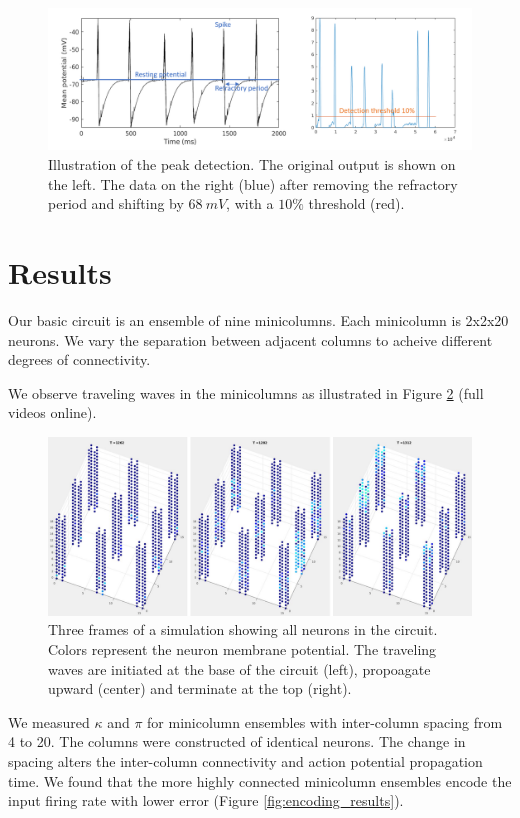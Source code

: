 \documentclass[a4paper,11pt]{article}
\begin{document}
\begin{figure}[!ht]
 \caption{Illustration of the peak detection. The original output is shown on the left. The data on the right (blue) after removing the refractory period and shifting by $68\ mV$, with a $10\%$ threshold (red). }
 \label{fig:peak_det}
 \centering
   \includegraphics[width=\textwidth]{fig/PeakDetectionExample}
\end{figure}


\clearpage
\section{Results}
Our basic circuit is an ensemble of nine minicolumns. 
Each minicolumn is 2x2x20 neurons. 
We vary the separation between adjacent columns to acheive different degrees of connectivity.

We observe traveling waves in the minicolumns as illustrated in Figure \ref{fig:firing_video} (full videos online).
\begin{figure}[!ht]
 \caption{Three frames of a simulation showing all neurons in the circuit. Colors represent the neuron membrane potential. The traveling waves are initiated at the base of the circuit (left), propoagate upward (center) and terminate at the top (right).} 
 \label{fig:firing_video}
 \centering
   \includegraphics[width=\textwidth]{fig/VideoStills}
\end{figure}

We measured $\kappa$ and $\pi$ for minicolumn ensembles with inter-column spacing from 4 to 20.
The columns were constructed of identical neurons.
The change in spacing alters the inter-column connectivity and action potential propagation time.
We found that the more highly connected minicolumn ensembles encode the input firing rate with lower error (Figure \ref{fig:encoding_results}).
\end{document}
